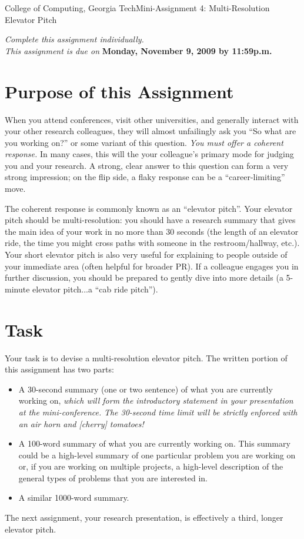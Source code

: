 \documentclass[11pt]{article}
\begin{document}


{College of Computing, Georgia Tech}{Mini-Assignment 4: Multi-Resolution
Elevator Pitch}

{\em Complete this assignment individually. \\  This
  assignment is due on} {\bf Monday, November 9, 2009 by 11:59p.m.}

\section{Purpose of this Assignment}

When you attend conferences, visit other universities, and generally
interact with your other research colleagues, they will almost
unfailingly ask you ``So what are you working on?'' or some variant of
this question.  {\em You must offer a coherent response.}  In many
cases, this will the your colleague's primary mode for judging you and
your research.  A strong, clear answer to this question can form a very
strong impression; on the flip side, a flaky response can be a
``career-limiting'' move.

The coherent response is commonly known as an ``elevator pitch''.  Your
elevator pitch should be multi-resolution: you should have a research
summary that gives the main idea of your work in no more than 30 seconds
(the length of an elevator ride, the time you might cross paths with
someone in the restroom/hallway, etc.).  Your short elevator pitch is
also very useful for explaining to people outside of your immediate area
(often helpful for broader PR).  If a colleague engages you in further
discussion, you should be prepared to gently dive into more details (a
5-minute elevator pitch...a ``cab ride pitch'').


\section{Task}

Your task is to devise a multi-resolution elevator pitch.  The written
portion of this assignment has two parts:
\begin{itemize}
\item A 30-second summary (one or two sentence) of what you are
  currently working on, {\em which will form the introductory statement
  in your presentation at the mini-conference.} {\em The 30-second time
  limit will be strictly enforced with an air horn and [cherry]
  tomatoes!}
\item A 100-word summary of what you are currently working on.  This
  summary could be a high-level summary of one particular problem you
  are working on or, if you are working on multiple projects, a
  high-level description of the general types of problems that you are
  interested in.
\item A similar 1000-word summary.
\end{itemize}
\noindent

The next assignment, your research presentation, is effectively a third,
longer elevator pitch.
\end{document}
